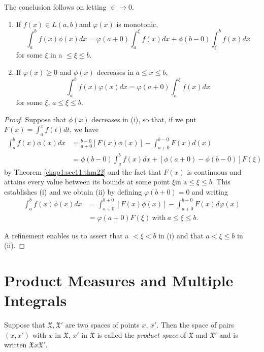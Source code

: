 The conclusion follows on letting $\in \rightarrow 0$.

\begin{theorem}\label{chap1:sec18:thm55}
\begin{enumerate}[\rm (i)]
\item If $f(x)\in L(a,b)$\break and $\varphi (x)$ is monotonic,
  $$
  \int^b_a f(x) \phi(x)dx=\varphi(a+0) \int^\xi_a f(x)dx + \phi(b-0)
  \int^b_\xi f(x) dx 
  $$ \pageoriginale
  for some $\xi$ in a $\le \xi \le b$.
\item If $\varphi(x) \ge 0$ and $\phi (x)$ decreases in $a\leq x \le b$,
  $$
  \int^b_a f(x) \varphi (x)dx=\varphi(a+0) \int^\xi_a f(x) dx
  $$
  for some $\xi$, $a \le \xi \le b$.
\end{enumerate}
\end{theorem}

\begin{proof}
Suppose that $\phi (x)$ decreases in (i), so that, if we put
$F(x)=\int^x_a f(t)dt$, we have 
\begin{align*}
  \int^b_a f(x) \phi (x)dx & ={}^{b-0}_{a+0}[F(x) \phi
    (x)]-\int^{b-0}_{a+0} F(x)d (x)\\ 
  & =\phi(b-0) \int^b_a f(x)dx +[\phi (a+0)-\phi (b-0)]F(\xi)
\end{align*}
 by Theorem \ref{chap1:sec11:thm22} and the fact that $F(x)$ is continuous and attains every
 value between its bounds at some point $\xi \text{in a} \le \xi \le
 b$. This establishes (i) and we obtain (ii) by defining
 $\varphi(b+0)=0$ and writing  
 \begin{align*}
   \int^b_a f(x) \phi (x) dx&=\int^{b+0}_{a+0}[ F(x) \phi(x) ]-\int^{b+0}_{a+0}
   F(x)d \varphi (x)\\  
   &=\varphi(a+0) F(\xi)  ~\text{with}~ a \le \xi \le b.
\end{align*}

A refinement enables us to assert that a $< \xi < b$ in (i) and that
$a < \xi \le b$ in (ii). 
\end{proof}

\section{Product Measures and Multiple Integrals}\label{chap1:sec19}

Suppose that $\mathfrak{X}, \mathfrak{X}'$ are two spaces of points
$x$, $x'$. Then the space of pairs $(x,x')$ with $x$ in $\mathfrak{X}$, $x'$ in
$\mathfrak{X}$ is called the \textit{product space} of $\mathfrak{X}$ and
$\mathfrak{X}'$ and is written $\mathfrak{X} x \mathfrak{X}'$. 

